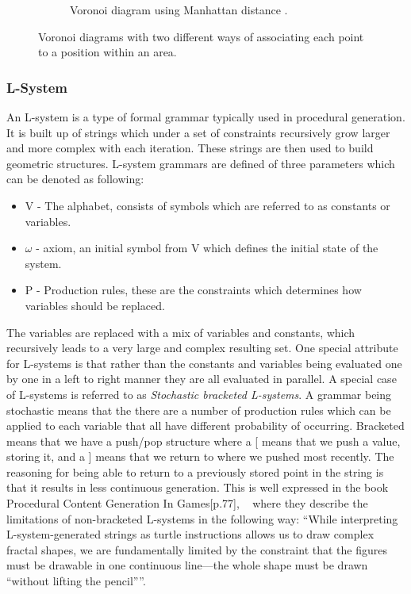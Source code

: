 \begin{figure}[H]
\begin{subfigure}[b]{0.49\textwidth}
    \caption{Voronoi diagram using Manhattan distance \cite{voronoi_diagram_manhattan}.}
    \label{fig:voronoi_manhattan}
  \end{subfigure}
  \caption{Voronoi diagrams with two different ways of associating each point to a position within an area.}
  \label{fig:voronoi}
\end{figure}

\subsubsection{L-System}
An L-system is a type of formal grammar typically used in procedural generation.
It is built up of strings which under a set of constraints recursively grow larger and more complex with each iteration.
These strings are then used to build geometric structures.
L-system grammars are defined of three parameters which can be denoted as following:

\begin{itemize}
  \item V  - The alphabet, consists of symbols which are referred to as constants or variables.
  \item $\omega$ - axiom, an initial symbol from V which defines the initial state of the system.
  \item P - Production rules, these are the constraints which determines how variables should be replaced.
\end{itemize}

The variables are replaced with a mix of variables and constants, which recursively leads to a very large and complex resulting set.
One special attribute  for L-systems is that rather than the constants and variables being evaluated one by one in a left to right manner they are all evaluated in parallel.
A special case of L-systems is referred to as \textit{Stochastic bracketed L-systems}.
A grammar being stochastic means that the there are a number of production rules which can be applied to each variable that all have different probability of occurring.
Bracketed means that we have a push/pop structure where a [ means that we push a value, storing it, and a ] means that we return to where we pushed most recently.
The reasoning for being able to return to a previously stored point in the string is that it results in less continuous generation.
This is well expressed in the book Procedural Content Generation In Games[p.77], ~\cite{PCG_in_games} where they describe the limitations of non-bracketed L-systems in the following way:
“While interpreting L-system-generated strings as turtle instructions allows us to draw complex fractal shapes, we are fundamentally limited by the constraint that the figures must be drawable in one continuous line—the whole shape must be drawn “without lifting the pencil””. 
